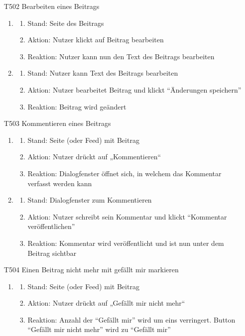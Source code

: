 \documentclass[parskip=full]{scrartcl}
\begin{document}
\begin{itemize}
		\item[T502] Bearbeiten eines Beitrags
		\begin{enumerate}
			\item
			\begin{enumerate}[nosep]	
				\item Stand: Seite des Beitrags
				\item Aktion: Nutzer klickt auf Beitrag bearbeiten
				\item Reaktion: Nutzer kann nun den Text des Beitrags bearbeiten
			\end{enumerate} 
			\item
			\begin{enumerate}[nosep]	
				\item Stand: Nutzer kann Text des Beitrags bearbeiten
				\item Aktion: Nutzer bearbeitet Beitrag und klickt “Änderungen speichern”
				\item Reaktion: Beitrag wird geändert
			\end{enumerate} 
		\end{enumerate}
		
		\newpage
		\item[T503] Kommentieren eines Beitrags
		\begin{enumerate}
			\item
			\begin{enumerate}[nosep]	
				\item Stand: Seite (oder \gls{Feed}) mit Beitrag
				\item Aktion: Nutzer drückt auf „Kommentieren“
				\item Reaktion: Dialogfenster öffnet sich, in welchem das Kommentar verfasst werden kann
			\end{enumerate} 
			\item
			\begin{enumerate}[nosep]	
				\item Stand: Dialogfenster zum Kommentieren
				\item Aktion: Nutzer schreibt sein Kommentar und klickt “Kommentar veröffentlichen”
				\item Reaktion: Kommentar wird veröffentlicht und ist nun unter dem Beitrag sichtbar
			\end{enumerate} 
		\end{enumerate}
		
		\item[T504]  Einen Beitrag nicht mehr mit gefällt mir markieren
		\begin{enumerate}
			\item
			\begin{enumerate}[nosep]	
				\item Stand: Seite (oder \gls{Feed}) mit Beitrag
				\item Aktion: Nutzer drückt auf „Gefällt mir nicht mehr“
				\item Reaktion: Anzahl der “Gefällt mir” wird um eins verringert. \gls{Button} “Gefällt mir nicht mehr” wird zu “Gefällt mir”
			\end{enumerate} 
		\end{enumerate}
		

\end{itemize}
\end{document}
